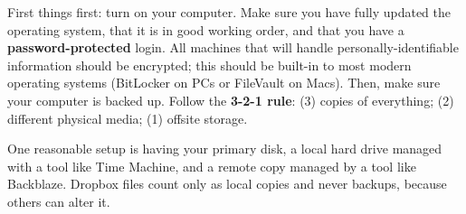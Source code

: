 First things first: turn on your computer.
Make sure you have fully updated the operating system,
that it is in good working order,
and that you have a \textbf{password-protected} login.
All machines that will handle personally-identifiable information should be encrypted;
this should be built-in to most modern operating systems (BitLocker on PCs or FileVault on Macs).
Then, make sure your computer is backed up.
Follow the \textbf{3-2-1 rule}:
(3) copies of everything;
(2) different physical media;
(1) offsite storage.

One reasonable setup is having your primary disk,
a local hard drive managed with a tool like Time Machine,
and a remote copy managed by a tool like Backblaze.
Dropbox files count only as local copies and never backups,
because others can alter it.


